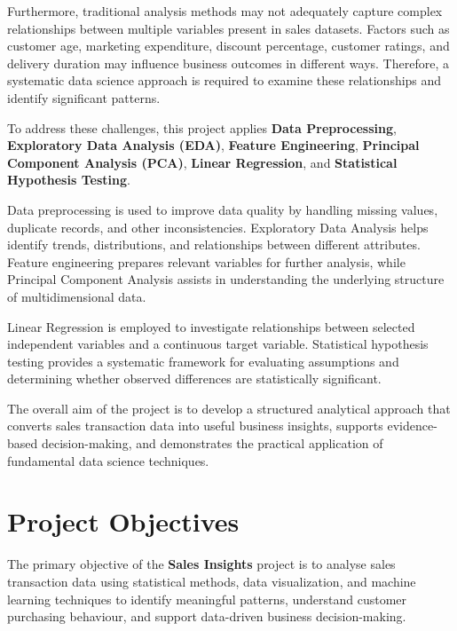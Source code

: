 \documentclass[12pt,a4paper]{report}
\begin{document}
Furthermore, traditional analysis methods may not
adequately capture complex relationships between
multiple variables present in sales datasets.
Factors such as customer age, marketing expenditure,
discount percentage, customer ratings, and delivery
duration may influence business outcomes in different
ways. Therefore, a systematic data science approach
is required to examine these relationships and
identify significant patterns.

To address these challenges, this project applies
\textbf{Data Preprocessing}, \textbf{Exploratory Data
Analysis (EDA)}, \textbf{Feature Engineering},
\textbf{Principal Component Analysis (PCA)},
\textbf{Linear Regression}, and
\textbf{Statistical Hypothesis Testing}.

Data preprocessing is used to improve data quality
by handling missing values, duplicate records,
and other inconsistencies. Exploratory Data Analysis
helps identify trends, distributions, and relationships
between different attributes. Feature engineering
prepares relevant variables for further analysis,
while Principal Component Analysis assists in
understanding the underlying structure of
multidimensional data.

Linear Regression is employed to investigate
relationships between selected independent
variables and a continuous target variable.
Statistical hypothesis testing provides a
systematic framework for evaluating assumptions
and determining whether observed differences
are statistically significant.

The overall aim of the project is to develop
a structured analytical approach that converts
sales transaction data into useful business
insights, supports evidence-based decision-making,
and demonstrates the practical application of
fundamental data science techniques.

\endgroup


\chapter{Project Objectives}

\begingroup
\fontsize{14}{21}\selectfont

The primary objective of the \textbf{Sales Insights}
project is to analyse sales transaction data using
statistical methods, data visualization, and machine
learning techniques to identify meaningful patterns,
understand customer purchasing behaviour, and
support data-driven business decision-making.
\end{document}

